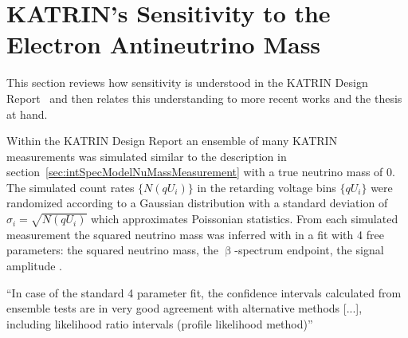 \section{KATRIN's Sensitivity to the Electron Antineutrino Mass}
\label{sec:statMethodsKatrinSensitivity}
This section reviews how sensitivity is understood in the KATRIN Design Report~\cite{Angrik:2005ep} and then relates this understanding to more recent works and the thesis at hand.

Within the KATRIN Design Report an ensemble of many KATRIN measurements was simulated similar to the description in section~\ref{sec:intSpecModelNuMassMeasurement} with a true neutrino mass of 0. The simulated count rates $\{N(qU_i)\}$ in the retarding voltage bins $\{qU_i\}$ were randomized according to a Gaussian distribution with a standard deviation of $\sigma_i=\sqrt{N(qU_i)}$ which approximates Poissonian statistics. From each simulated measurement the squared neutrino mass was inferred with in a fit with 4 free parameters: the squared neutrino mass, the $\upbeta$-spectrum endpoint, the signal amplitude .





``In case of the standard 4 parameter fit, the confidence intervals calculated from ensemble tests are in very good agreement with alternative methods [...], including likelihood ratio intervals (profile likelihood method)''